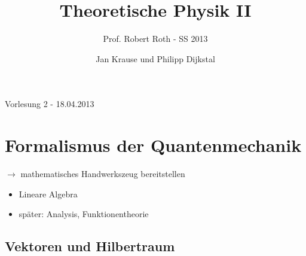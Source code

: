\documentclass[10pt,article,colorback,accentcolor=tud9d]{scrartcl}
\title{Theoretische Physik II}
\subtitle{Prof. Robert Roth - SS 2013}
\author{Jan Krause und Philipp Dijkstal}
\date{ }
\begin{document}
\maketitle
\tableofcontents
\newpage
\begin{flushright}Vorlesung 2 - 18.04.2013\end{flushright}
\section{Formalismus der Quantenmechanik}
$\rightarrow$ mathematisches Handwerkszeug bereitstellen
\begin{itemize}
\item Lineare Algebra
\item später: Analysis, Funktionentheorie
\end{itemize}
\subsection{Vektoren und Hilbertraum}
\end{document}
